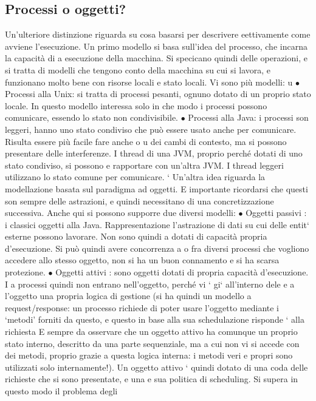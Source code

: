 \documentclass[a4paper,12pt]{article}
\begin{document}
\subsection{Processi o oggetti?}
Un'ulteriore distinzione riguarda su cosa basarsi per descrivere eettivamente
come avviene l'esecuzione.
Un primo modello si basa sull'idea del processo, che incarna la capacità di
a
esecuzione della macchina. Si specicano quindi delle operazioni, e si tratta di
modelli che tengono conto della macchina su cui si lavora, e funzionano molto
bene con risorse locali e stato locali. Vi sono più modelli:
u
$\bullet$ Processi alla Unix: si tratta di processi pesanti, ognuno dotato di un
proprio stato locale. In questo modello interessa solo in che modo i processi
possono comunicare, essendo lo stato non condivisibile.
$\bullet$ Processi alla Java: i processi son leggeri, hanno uno stato condiviso che
può essere usato anche per comunicare. Risulta essere più facile fare anche
o
u
dei cambi di contesto, ma si possono presentare delle interferenze.
I thread di una JVM, proprio perché dotati di uno stato condiviso, si possono
e
rapportare con un'altra JVM. I thread leggeri utilizzano lo stato comune per
comunicare.
`
Un'altra idea riguarda la modellazione basata sul paradigma ad oggetti. E
importante ricordarsi che questi son sempre delle astrazioni, e quindi necessitano
di una concretizzazione successiva. Anche qui si possono supporre due diversi
modelli:
$\bullet$ Oggetti passivi : i classici oggetti alla Java. Rappresentazione l'astrazione
di dati su cui delle entit` esterne possono lavorare. Non sono quindi
a
dotati di capacità propria d'esecuzione. Si può quindi avere concorrenza
a
o
fra diversi processi che vogliono accedere allo stesso oggetto, non si ha un
buon connamento e si ha scarsa protezione.
$\bullet$ Oggetti attivi : sono oggetti dotati di propria capacità d'esecuzione. I
a
processi quindi non entrano nell'oggetto, perché vi ` gi` all'interno dele
e a
l'oggetto una propria logica di gestione (si ha quindi un modello a request/response: un processo richiede di poter
usare l'oggetto mediante i
{`}metodi' forniti da questo, e questo in base alla sua schedulazione risponde
`
alla richiesta E sempre da osservare che un oggetto attivo ha comunque
un proprio stato interno, descritto da una parte sequenziale, ma a cui
non vi si accede con dei metodi, proprio grazie a questa logica interna: i
metodi veri e propri sono utilizzati solo internamente!). Un oggetto attivo
` quindi dotato di una coda delle richieste che si sono presentate, e una
e
sua politica di scheduling. Si supera in questo modo il problema degli
\end{document}
